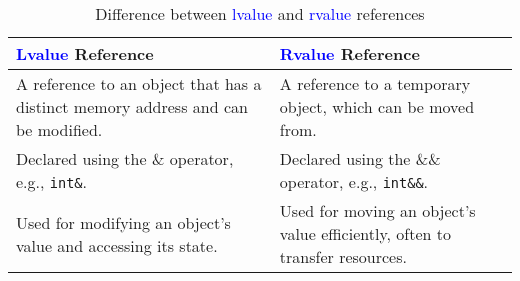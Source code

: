 \documentclass{article}
\begin{document}
\begin{table}[htbp]
    \centering
    \caption{Difference between \textcolor{blue}{lvalue} and \textcolor{blue}{rvalue} references}
    \renewcommand{\arraystretch}{1.5}
    \begin{tabular}{|>{\raggedright\arraybackslash}m{7cm}|>{\raggedright\arraybackslash}m{7cm}|}
        \hline
        \rowcolor{gray!30}
        \textbf{\textcolor{blue}{Lvalue} Reference} & \textbf{\textcolor{blue}{Rvalue} Reference} \\
        \hline
        A reference to an object that has a distinct memory address and can be modified. & A reference to a temporary object, which can be moved from. \\
        \hline
        Declared using the \& operator, e.g., \texttt{int\&}. & Declared using the \&\& operator, e.g., \texttt{int\&\&}. \\
        \hline
        Used for modifying an object's value and accessing its state. & Used for moving an object's value efficiently, often to transfer resources. \\
        \hline
    \end{tabular}
\end{table}

 
\end{document}
